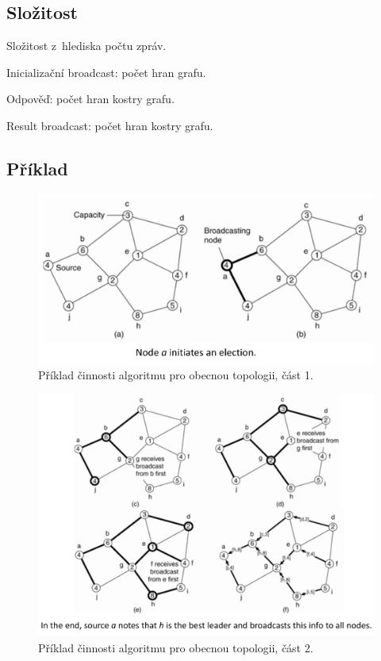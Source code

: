 \subsection{Složitost}

\begin{compactitem}
    \item Složitost z~hlediska počtu zpráv.
    \item Inicializační broadcast: počet hran grafu.
    \item Odpověď: počet hran kostry grafu.
    \item Result broadcast: počet hran kostry grafu.
\end{compactitem}

\subsection{Příklad}

\begin{figure}[H]
    \centering
    \includegraphics[width=1\linewidth]{example_general_topology_p1.pdf}
    \caption{Příklad činnosti algoritmu pro obecnou topologii, část 1.}
\end{figure}

\begin{figure}[H]
    \centering
    \includegraphics[width=1\linewidth]{example_general_topology_p2.pdf}
    \caption{Příklad činnosti algoritmu pro obecnou topologii, část 2.}
\end{figure}
